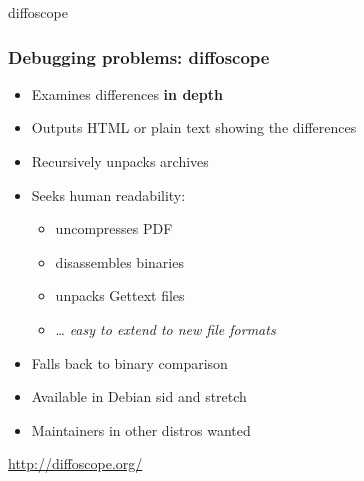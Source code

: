\documentclass[14pt]{beamer}
\begin{document}
{
\begin{frame}{diffoscope}
 \frametitle{Debugging problems: diffoscope}

 \begin{itemize}
  \item Examines differences \textbf{in depth}
  \item Outputs HTML or plain text showing the differences
  \item Recursively unpacks archives
  \item Seeks human readability:
   \begin{itemize}
    \item uncompresses PDF
    \item disassembles binaries
    \item unpacks Gettext files
    \item … \textit{easy to extend to new file formats}
   \end{itemize}
  \item Falls back to binary comparison
  \item Available in Debian sid and stretch
  \item Maintainers in other distros wanted
 \end{itemize}
 \vfill
 \begin{center}
  \url{http://diffoscope.org/}\\
  {\footnotesize {}}
 \end{center}
\end{frame}
}
\end{document}
